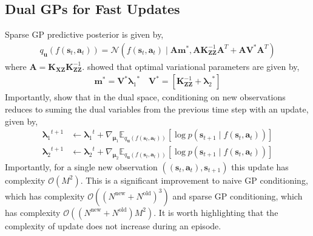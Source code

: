 \documentclass{article}
\newcommand{\state}{\ensuremath{\mathbf{s}}}
\newcommand{\action}{\ensuremath{\mathbf{a}}}
\newcommand{\inducingInput}{\ensuremath{\mathbf{Z}}}
\newcommand{\inducingVariable}{\ensuremath{\mathbf{u}}}
\newcommand{\dualParam}[1]{\ensuremath{\bm{\lambda}_{#1}}}
\newcommand{\meanParam}[1]{\ensuremath{\bm{\mu}_{#1}}}
\newcommand{\numDataNew}{\ensuremath{N^{\text{new}}}}
\newcommand{\numDataOld}{\ensuremath{N^{\text{old}}}}
\newcommand{\numInducing}{\ensuremath{M}}
\newcommand{\transitionFn}{\ensuremath{f}}
\newcommand{\latentFn}{\ensuremath{f}}
\begin{document}
\subsection{Dual GPs for Fast Updates}
Sparse GP predictive posterior is given by,
\begin{align} \label{eq-svgp-predictive-posterior}
  q_{\inducingVariable}(\transitionFn(\state_{t}, \action_{t})) = \mathcal{N}
  \left( \transitionFn(\state_{t}, \action_{t}) \mid \mathbf{A} \mathbf{m}^{*}, \mathbf{A}\mathbf{K}_{\inducingInput\inducingInput}^{-1} \mathbf{A}^{T} + \mathbf{A} \mathbf{V}^{*} \mathbf{A}^{T} \right)
\end{align}
where $\mathbf{A} = \mathbf{K}_{\mathbf{X}\inducingInput} \mathbf{K}^{-1}_{\inducingInput\inducingInput}$.
\cite{adamDualParameterizationSparse2021} showed that optimal variational parameters are given by,
\begin{align} \label{eq-dual-params}
\mathbf{m}^{*} = \mathbf{V}^{*}\dualParam{1}^{*} \quad \mathbf{V}^{*} = [\mathbf{K}_{\inducingInput\inducingInput}^{-1} + \dualParam{2}^{*}]
\end{align}
Importantly, \cite{changFantasizingDualGPs2022} show that in the dual space,
conditioning on new observations reduces to suming the dual variables from the previous time
step with an update, given by,
\begin{align} \label{eq-dual-update-svgp}
\dualParam{1}^{t+1} &\leftarrow \dualParam{1}^{t} +  \nabla_{\meanParam{1}} \mathbb{E}_{q_{\inducingVariable}(\latentFn(\state_{t}, \action_{t}))} \left[ \log p(\state_{t+1} \mid \latentFn(\state_{t}, \action_{t}) ) \right] \\
\dualParam{2}^{t+1} &\leftarrow \dualParam{2}^{t} +  \nabla_{\meanParam{2}} \mathbb{E}_{q_{\inducingVariable}(\latentFn(\state_{t}, \action_{t}))}  \left[ \log p(\state_{t+1} \mid \latentFn(\state_{t}, \action_{t}) ) \right]
\end{align}
Importantly, for a single new observation $((\state_{t}, \action_{t}), \state_{t+1})$ this update has
complexity $\mathcal{O}(\numInducing^{2})$.
This is a significant improvement to naive GP conditioning, which has complexity $\mathcal{O}((\numDataNew + \numDataOld)^{3})$
and sparse GP conditioning, which has complexity $\mathcal{O}((\numDataNew + \numDataOld)\numInducing^{2})$.
It is worth highlighting that the complexity of \cite{changFantasizingDualGPs2022} update does not increase during an episode.
\end{document}
